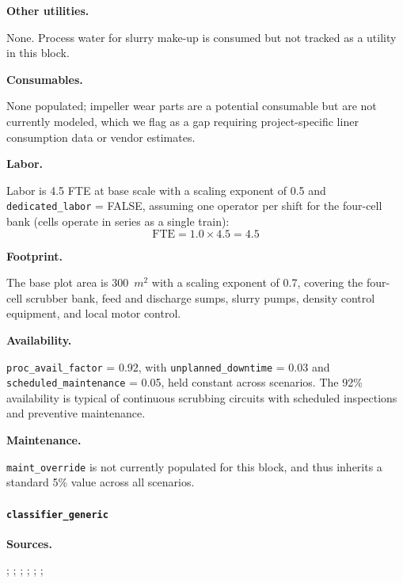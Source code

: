 \medskip
\noindent\textbf{Other utilities.}\quad

None. Process water for slurry make-up is consumed but not tracked as a utility in this block.


\medskip
\noindent\textbf{Consumables.}\quad

None populated; impeller wear parts are a potential consumable but are not currently modeled, which we flag as a gap requiring project-specific liner consumption data or vendor estimates.


\medskip
\noindent\textbf{Labor.}\quad

Labor is 4.5 FTE at base scale with a scaling exponent of 0.5 and \texttt{dedicated\_labor} = FALSE, assuming one operator per shift for the four-cell bank (cells operate in series as a single train):
\[
	\text{FTE} = 1.0 \times 4.5 = 4.5
\]

\medskip
\noindent\textbf{Footprint.}\quad

The base plot area is 300~$\si{m^2}$ with a scaling exponent of 0.7, covering the four-cell scrubber bank, feed and discharge sumps, slurry pumps, density control equipment, and local motor control.


\medskip
\noindent\textbf{Availability.}\quad

\texttt{proc\_avail\_factor} = 0.92, with \texttt{unplanned\_downtime} = 0.03 and \texttt{scheduled\_maintenance} = 0.05, held constant across scenarios. The 92\% availability is typical of continuous scrubbing circuits with scheduled inspections and preventive maintenance.

\medskip
\noindent\textbf{Maintenance.}\quad

\texttt{maint\_override} is not currently populated for this block, and thus inherits a standard 5\% value across all scenarios.

\clearpage
\paragraph{\texttt{classifier\_generic}}\label{app:04-methods-blockdefs-classifier}

\medskip
\noindent\textbf{Sources.}\quad

\citet{flsmidthKREBSGMAXMolded2024}; \citet{ausimmMonograph27Cost}; \citet{metso:outotecBasicsMineralsProcessing2024}; \citet{sgscanadaincSK1300Technical2024}; \citet{riordanTonopahLithiumClaims2023}; \citet{laneNI43101Technical2024}; \citet{nationalrenewableenergylaboratorynrelgoldencoImprovingPumpingSystem2006enewable}

